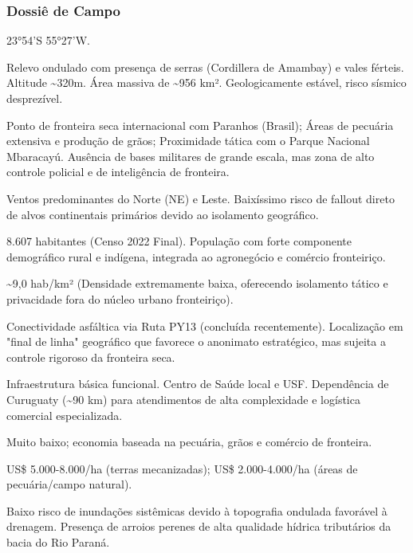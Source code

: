 \subsubsection{Dossiê de Campo}
\begin{description}[style=nextline,leftmargin=0.5cm,font=\bfseries]
\item[Coordenadas]  23°54'S 55°27'W.
\item[Topografia]  Relevo ondulado com presença de serras (Cordillera de Amambay) e vales férteis. Altitude \textasciitilde 320m. Área massiva de \textasciitilde 956 km². Geologicamente estável, risco sísmico desprezível.
\item[Alvos Estratégicos]  Ponto de fronteira seca internacional com Paranhos (Brasil); Áreas de pecuária extensiva e produção de grãos; Proximidade tática com o Parque Nacional Mbaracayú. Ausência de bases militares de grande escala, mas zona de alto controle policial e de inteligência de fronteira.
\item[Fallout]  Ventos predominantes do Norte (NE) e Leste. Baixíssimo risco de fallout direto de alvos continentais primários devido ao isolamento geográfico.
\item[População]  8.607 habitantes (Censo 2022 Final). População com forte componente demográfico rural e indígena, integrada ao agronegócio e comércio fronteiriço.
\item[Densidade]  \textasciitilde 9,0 hab/\allowbreak km² (Densidade extremamente baixa, oferecendo isolamento tático e privacidade fora do núcleo urbano fronteiriço).
\item[Vias de Acesso]  Conectividade asfáltica via Ruta PY13 (concluída recentemente). Localização em "final de linha" geográfico que favorece o anonimato estratégico, mas sujeita a controle rigoroso da fronteira seca.
\item[Serviços]  Infraestrutura básica funcional. Centro de Saúde local e USF. Dependência de Curuguaty (\textasciitilde 90 km) para atendimentos de alta complexidade e logística comercial especializada.
\item[Custo de Vida]  Muito baixo; economia baseada na pecuária, grãos e comércio de fronteira.
\item[Preço da Terra]  US\$ 5.000-8.000/\allowbreak ha (terras mecanizadas); US\$ 2.000-4.000/\allowbreak ha (áreas de pecuária/\allowbreak campo natural).
\item[Hidrologia]  Baixo risco de inundações sistêmicas devido à topografia ondulada favorável à drenagem. Presença de arroios perenes de alta qualidade hídrica tributários da bacia do Rio Paraná.

\end{description}
